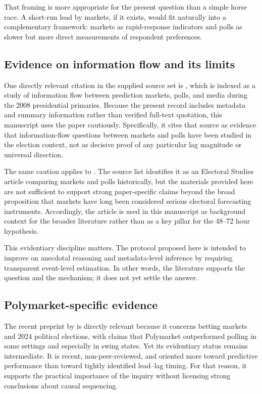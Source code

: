\documentclass[11pt]{article}
\begin{document}
That framing is more appropriate for the present question than a simple horse race. A short-run lead by markets, if it exists, would fit naturally into a complementary framework: markets as rapid-response indicators and polls as slower but more direct measurements of respondent preferences.

\subsection{Evidence on information flow and its limits}
One directly relevant citation in the supplied source set is \citet{informationflowbet2018ideas}, which is indexed as a study of information flow between prediction markets, polls, and media during the 2008 presidential primaries. Because the present record includes metadata and summary information rather than verified full-text quotation, this manuscript uses the paper cautiously. Specifically, it cites that source as evidence that information-flow questions between markets and polls have been studied in the election context, not as decisive proof of any particular lag magnitude or universal direction.

The same caution applies to \citet{marketsvspollsasel2000scienced}. The source list identifies it as an Electoral Studies article comparing markets and polls historically, but the materials provided here are not sufficient to support strong paper-specific claims beyond the broad proposition that markets have long been considered serious electoral forecasting instruments. Accordingly, the article is used in this manuscript as background context for the broader literature rather than as a key pillar for the 48--72 hour hypothesis.

This evidentiary discipline matters. The protocol proposed here is intended to improve on anecdotal reasoning and metadata-level inference by requiring transparent event-level estimation. In other words, the literature supports the question and the mechanism; it does not yet settle the answer.

\subsection{Polymarket-specific evidence}
The recent preprint by \citet{arebettingmarketsb2025arxiv} is directly relevant because it concerns betting markets and 2024 political elections, with claims that Polymarket outperformed polling in some settings and especially in swing states. Yet its evidentiary status remains intermediate. It is recent, non-peer-reviewed, and oriented more toward predictive performance than toward tightly identified lead--lag timing. For that reason, it supports the practical importance of the inquiry without licensing strong conclusions about causal sequencing.
\end{document}
